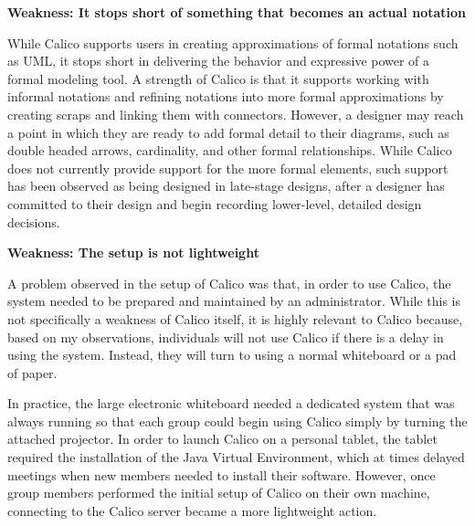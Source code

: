 \textbf{Weakness: It stops short of something that becomes an actual notation}

While Calico supports users in creating approximations of formal notations such as UML, it stops short in delivering the behavior and expressive power of a formal modeling tool. A strength of Calico is that it supports working with informal notations and refining notations into more formal approximations by creating scraps and linking them with connectors. However, a designer may reach a point in which they are ready to add formal detail to their diagrams, such as double headed arrows, cardinality, and other formal relationships. While Calico does not currently provide support for the more formal elements, such support has been observed as being designed in late-stage designs, after a designer has committed to their design and begin recording lower-level, detailed design decisions.


\textbf{Weakness: The setup is not lightweight}

A problem observed in the setup of Calico was that, in order to use Calico, the system needed to be prepared and maintained by an administrator. While this is not specifically a weakness of Calico itself, it is highly relevant to Calico because, based on my observations, individuals will not use Calico if there is a delay in using the system. Instead, they will turn to using a normal whiteboard or a pad of paper. 

In practice, the large electronic whiteboard needed a dedicated system that was always running so that each group could begin using Calico simply by turning the attached projector. In order to launch Calico on a personal tablet, the tablet required the installation of the Java Virtual Environment, which at times delayed meetings when new members needed to install their software. However, once group members performed the initial setup of Calico on their own machine, connecting to the Calico server became a more lightweight action.

